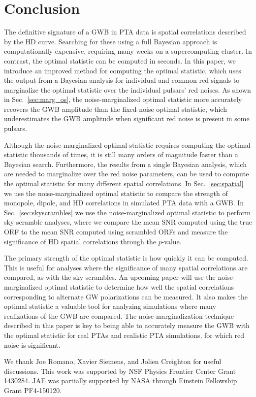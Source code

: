 \documentclass[twocolumn,aps,prd,superscriptaddress]{revtex4-1}
\begin{document}
\section{Conclusion}
\label{sec:conclusion}

The definitive signature of a GWB in PTA data is spatial correlations 
described by the HD curve. 
Searching for these using a full Bayesian approach is computationally expensive, 
requiring many weeks on a supercomputing cluster. 
In contrast, the optimal statistic can be computed in seconds. 
In this paper, we introduce an improved method 
for computing the optimal statistic, 
which uses the output from a Bayesian analysis 
for individual and common red signals 
to marginalize the optimal statistic over the individual pulsars' red noises. 
As shown in Sec.~\ref{sec:marg_os}, 
the noise-marginalized optimal statistic more accurately recovers the GWB amplitude 
than the fixed-noise optimal statistic, which underestimates the GWB amplitude 
when significant red noise is present in some pulsars.

Although the noise-marginalized optimal statistic 
requires computing the optimal statistic thousands of times, 
it is still many orders of magnitude faster than a Bayesian search. 
Furthermore, the results from a single Bayesian analysis, 
which are needed to marginalize over the red noise parameters, 
can be used to compute the optimal statistic for many different spatial correlations. 
In Sec.~\ref{sec:spatial} we use the noise-marginalized optimal statistic 
to compare the strength of monopole, dipole, and HD correlations 
in simulated PTA data with a GWB. 
In Sec.~\ref{sec:skyscrambles} we use the noise-marginalized optimal statistic 
to perform sky scramble analyses, where we compare the mean SNR 
computed using the true ORF to the mean SNR computed using scrambled ORFs 
and measure the significance of HD spatial correlations through the $p$-value.

The primary strength of the optimal statistic is how quickly it can be computed. 
This is useful for analyses where the significance of many spatial correlations are compared, 
as with the sky scrambles. 
An upcoming paper will use the noise-marginalized optimal statistic 
to determine how well the spatial correlations corresponding to alternate GW polarizations 
can be measured. 
It also makes the optimal statistic a valuable tool for analyzing simulations 
where many realizations of the GWB are compared. 
The noise marginalization technique described in this paper is key 
to being able to accurately measure the GWB with the optimal statistic 
for real PTAs and realistic PTA simulations, 
for which red noise is significant.


\acknowledgments
We thank Joe Romano, Xavier Siemens, and Jolien Creighton for useful discussions. 
This work was supported by NSF Physics Frontier Center Grant 1430284. 
JAE was partially supported by NASA through Einstein Fellowship Grant PF4-150120. 




\end{document}
